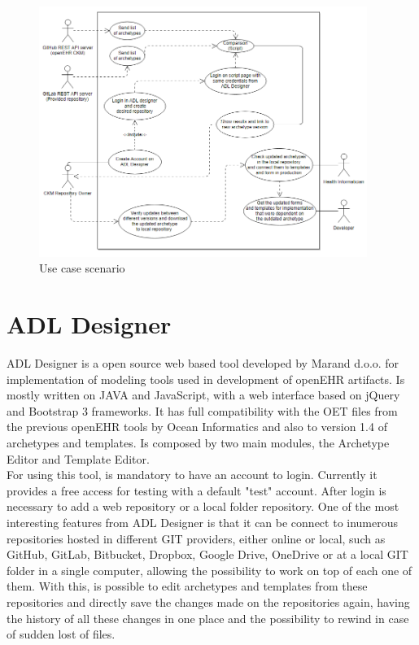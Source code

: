 \documentclass[mim_thesis.tex]{subfiles}
\begin{document}
\begin{figure}[H]
	\centering
    \includegraphics[width=0.95\textwidth]{img/usecase2.PNG}
	\caption{Use case scenario}
	\label{fig:use_case}
\end{figure}


\newpage
\section{ADL Designer}
ADL Designer is a open source web based tool developed by Marand d.o.o. for implementation of modeling tools used in development of openEHR artifacts. Is mostly written on JAVA and JavaScript, with a web interface based on jQuery and Bootstrap 3 frameworks. It has full compatibility with the OET files from the previous openEHR tools by Ocean Informatics and also to version 1.4 of archetypes and templates. Is composed by two main modules, the Archetype Editor and Template Editor. \\

For using this tool, is mandatory to have an account to login. Currently it provides a free access for testing with a default "test" account. After login is necessary to add a web repository or a local folder repository. One of the most interesting features from ADL Designer is that it can be connect to inumerous repositories hosted in different GIT providers, either online or local, such as GitHub, GitLab, Bitbucket, Dropbox, Google Drive, OneDrive or at a local GIT folder in a single computer, allowing the possibility to work on top of each one of them. With this, is possible to edit archetypes and templates from these repositories and directly save the changes made on the repositories again, having the history of all these changes in one place and the possibility to rewind in case of sudden lost of files.
\end{document}
